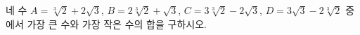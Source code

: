 네 수 $A=\sqrt[3]{2}+2\sqrt{3}$, $B=2\sqrt[3]{2}+\sqrt{3}$, $C=3\sqrt[3]{2}-2\sqrt{3}$, $D=3\sqrt{3}-2\sqrt[3]{2}$ 중에서 가장 큰 수와 가장 작은 수의 합을 구하시오.

